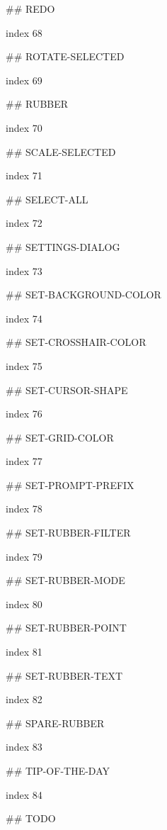 ## REDO

index 68



## ROTATE-SELECTED

index 69



## RUBBER

index 70



## SCALE-SELECTED

index 71



## SELECT-ALL

index 72



## SETTINGS-DIALOG

index 73



## SET-BACKGROUND-COLOR

index 74



## SET-CROSSHAIR-COLOR

index 75



## SET-CURSOR-SHAPE

index 76



## SET-GRID-COLOR

index 77



## SET-PROMPT-PREFIX

index 78



## SET-RUBBER-FILTER

index 79



## SET-RUBBER-MODE

index 80



## SET-RUBBER-POINT

index 81



## SET-RUBBER-TEXT

index 82



## SPARE-RUBBER

index 83



## TIP-OF-THE-DAY

index 84



## TODO

